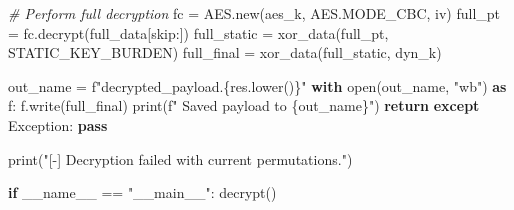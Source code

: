 \documentclass[
]{article}
\newenvironment{Shaded}{}{}
\newcommand{\BuiltInTok}[1]{\textcolor[rgb]{0.00,0.50,0.00}{#1}}
\newcommand{\CommentTok}[1]{\textcolor[rgb]{0.38,0.63,0.69}{\textit{#1}}}
\newcommand{\ControlFlowTok}[1]{\textcolor[rgb]{0.00,0.44,0.13}{\textbf{#1}}}
\newcommand{\ImportTok}[1]{\textcolor[rgb]{0.00,0.50,0.00}{\textbf{#1}}}
\newcommand{\NormalTok}[1]{#1}
\newcommand{\OperatorTok}[1]{\textcolor[rgb]{0.40,0.40,0.40}{#1}}
\newcommand{\PreprocessorTok}[1]{\textcolor[rgb]{0.74,0.48,0.00}{#1}}
\newcommand{\SpecialCharTok}[1]{\textcolor[rgb]{0.25,0.44,0.63}{#1}}
\newcommand{\SpecialStringTok}[1]{\textcolor[rgb]{0.73,0.40,0.53}{#1}}
\newcommand{\StringTok}[1]{\textcolor[rgb]{0.25,0.44,0.63}{#1}}
\newcommand{\VariableTok}[1]{\textcolor[rgb]{0.10,0.09,0.49}{#1}}
\begin{document}
\begin{Shaded}
\begin{Highlighting}[]
                            \CommentTok{\# Perform full decryption}
\NormalTok{                            fc }\OperatorTok{=}\NormalTok{ AES.new(aes\_k, AES.MODE\_CBC, iv)}
\NormalTok{                            full\_pt }\OperatorTok{=}\NormalTok{ fc.decrypt(full\_data[skip:])}
\NormalTok{                            full\_static }\OperatorTok{=}\NormalTok{ xor\_data(full\_pt, STATIC\_KEY\_BURDEN)}
\NormalTok{                            full\_final }\OperatorTok{=}\NormalTok{ xor\_data(full\_static, dyn\_k)}
                            
\NormalTok{                            out\_name }\OperatorTok{=} \SpecialStringTok{f"decrypted\_payload.}\SpecialCharTok{\{}\NormalTok{res}\SpecialCharTok{.}\NormalTok{lower()}\SpecialCharTok{\}}\SpecialStringTok{"}
                            \ControlFlowTok{with} \BuiltInTok{open}\NormalTok{(out\_name, }\StringTok{"wb"}\NormalTok{) }\ImportTok{as}\NormalTok{ f: f.write(full\_final)}
                            \BuiltInTok{print}\NormalTok{(}\SpecialStringTok{f"    Saved payload to }\SpecialCharTok{\{}\NormalTok{out\_name}\SpecialCharTok{\}}\SpecialStringTok{"}\NormalTok{)}
                            \ControlFlowTok{return}
                \ControlFlowTok{except} \PreprocessorTok{Exception}\NormalTok{: }\ControlFlowTok{pass}

    \BuiltInTok{print}\NormalTok{(}\StringTok{"[{-}] Decryption failed with current permutations."}\NormalTok{)}

\ControlFlowTok{if} \VariableTok{\_\_name\_\_} \OperatorTok{==} \StringTok{"\_\_main\_\_"}\NormalTok{:}
\NormalTok{    decrypt()}
\end{Highlighting}
\end{Shaded}
\end{document}
